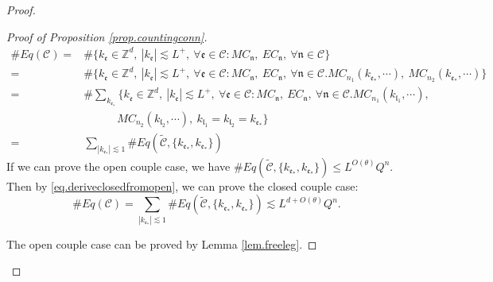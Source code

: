 \begin{proof}
\begin{proof}[Proof of Proposition \ref{prop.countingconn}]
    \begin{equation}\label{eq.deriveclosedfromopen}
    \begin{split}
    \#Eq(\mathcal{C})=&\#\{k_{\mathfrak{e}}\in \mathbb{Z}^d,\ |k_{\mathfrak{e}}| \lesssim L^+,\ \forall \mathfrak{e}\in \mathcal{C}:MC_{\mathfrak{n}},\  EC_{\mathfrak{n}},\ \forall \mathfrak{n}\in \mathcal{C}\} 
    \\
    =&\#\{k_{\mathfrak{e}}\in \mathbb{Z}^d,\ |k_{\mathfrak{e}}| \lesssim L^+,\ \forall \mathfrak{e}\in \mathcal{C}:MC_{\mathfrak{n}},\  EC_{\mathfrak{n}},\ \forall \mathfrak{n}\in \mathcal{C}. MC_{n_1}(k_{\mathfrak{e}_*},\cdots),\ MC_{n_2}(k_{\mathfrak{e}_*},\cdots)\} 
    \\
    =&\#\sum_{k_{\mathfrak{e}_*}}\{k_{\mathfrak{e}}\in \mathbb{Z}^d,\ |k_{\mathfrak{e}}| \lesssim L^+,\ \forall \mathfrak{e}\in \mathcal{C}:MC_{\mathfrak{n}},\  EC_{\mathfrak{n}},\ \forall \mathfrak{n}\in \mathcal{C}. MC_{n_1}(k_{\mathfrak{l}_1},\cdots),
    \\
    &\qquad\quad MC_{n_2}(k_{\mathfrak{l}_2},\cdots),\ k_{\mathfrak{l}_1}=k_{\mathfrak{l}_2}=k_{\mathfrak{e}_*}\} 
    \\
    =&\sum_{|k_{\mathfrak{e}_*}|\lesssim 1} \#Eq(\widetilde{\mathcal{C}},\{k_{\mathfrak{e}_*},k_{\mathfrak{e}_*}\})
    \end{split}
    \end{equation}
    If we can prove the open couple case, we have $\#Eq(\widetilde{\mathcal{C}},\{k_{\mathfrak{e}_*},k_{\mathfrak{e}_*}\})\le L^{O(\theta)} Q^{n}$. Then by \eqref{eq.deriveclosedfromopen}, we can prove the closed couple case: 
    \begin{equation}
     \#Eq(\mathcal{C})=\sum_{|k_{\mathfrak{e}_*}|\lesssim 1} \#Eq(\widetilde{\mathcal{C}},\{k_{\mathfrak{e}_*},k_{\mathfrak{e}_*}\})\lesssim L^{d+O(\theta)} Q^{n}.
    \end{equation}
    
    The open couple case can be proved by Lemma \ref{lem.freeleg}.
    

\end{proof}
\end{proof}
